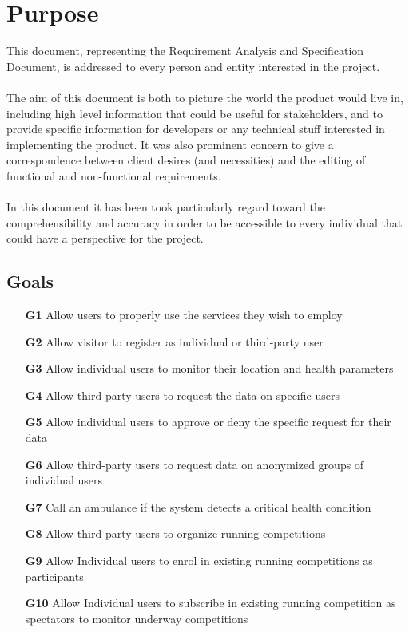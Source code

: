 \section{Purpose}
This document, representing the Requirement Analysis and Specification Document, is addressed to every person and entity interested in the project.  \\
\\
The aim of this document is both to picture the world the product would live in, including high level information that could be useful for stakeholders, and to provide specific information for developers or any technical stuff interested in implementing the product. It was also prominent concern to give a correspondence between client desires (and necessities) and the editing of functional and non-functional requirements. \\
\\
In this document it has been took particularly regard toward the comprehensibility and accuracy in order to be accessible to every individual that could have a perspective for the project. 
\subsection{Goals}
\begin{itemize}
\item
[\textbf{G1}] Allow users to properly use the services they wish to employ
\item
[\textbf{G2}] Allow visitor to register as individual or third-party user
\item
[\textbf{G3}] Allow individual users to monitor their location and health parameters
\item
[\textbf{G4}] Allow third-party users to request the data on specific users
\item
[\textbf{G5}] Allow individual users to approve or deny the specific request for their data
\item
[\textbf{G6}] Allow third-party users to request data on anonymized groups of individual users
\item
[\textbf{G7}] Call an ambulance if the system detects a critical health condition
\item
[\textbf{G8}] Allow third-party users to organize running competitions
\item
[\textbf{G9}] Allow Individual users to enrol in existing running competitions as participants 
\item
[\textbf{G10}] Allow Individual users to subscribe in existing running competition as spectators to monitor underway competitions
\end{itemize}



